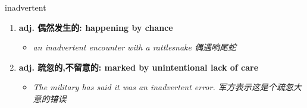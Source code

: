
\begin{frame}
{\huge inadvertent}
\begin{center}
\begin{enumerate}\Large
  \item \textbf{adj. 偶然发生的: happening by chance}
  \begin{itemize}
    \item \em{\Large{an inadvertent encounter with a rattlesnake 偶遇响尾蛇}}
  \end{itemize}
  \item \textbf{adj. 疏忽的,不留意的: marked by unintentional lack of care}
  \begin{itemize}
    \item \em{\Large{The military has said it was an inadvertent error. 军方表示这是个疏忽大意的错误}}
  \end{itemize}
\end{enumerate}
\end{center}
\end{frame}
